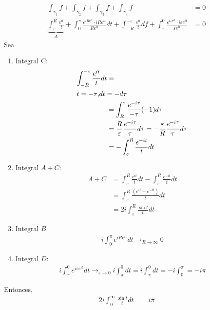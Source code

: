 \begin{ejemplo}
\begin{sol}
\begin{enumerate}
\begin{align*}
                \int_{\gamma_1}f+\int_{\gamma_2}f+\int_{\gamma_3}f+\int_{\gamma_4}f &= 0\\
                \underbrace{\int_{\varepsilon}^R \frac{e^{it}}{t}}_{A}+ \int_{0}^{\pi} \frac{e^{iRe^{it}}\cdot iRe^{it}}{Re^{it}}dt+\int_{-R}^{-\varepsilon}\frac{e^{it}}{t}df+\int_\pi^0 \frac{e^{i\varepsilon e^{it}}\cdot i\varepsilon e^{it}}{\varepsilon e^{it}} &= 0
            \end{align*}
            Sea 
            \begin{enumerate}
                \item Integral C:
                \begin{align*}
                    \int_{-R}^{-\varepsilon}\frac{e^{it}}{t}dt &=\\
                    \intertext{$t=-\tau$,$dt=-d\tau$}
                    &= \int_{R}^{\varepsilon}\frac{e^{-i\tau}}{-\tau}(-1)d\tau\\
                    &= \frac{R}{\varepsilon} \frac{e^{-i\tau}}{\tau}d\tau = -\frac{\varepsilon}{R}\frac{e^{-i\tau}}{\tau}d\tau\\
                    &= -\int_{\varepsilon}^R\frac{e^{-it}}{t}dt
                \end{align*}
                \item Integral $A+C$: 
                \begin{align*}
                    A+C &= \int_{\varepsilon}^R \frac{e^{it}}{t}dt -\int_{\varepsilon}^R\frac{e^{-it}}{t}dt\\
                    &= \int_{\varepsilon}^R \frac{(e^{it}-e^{-it})}{t}dt\\
                    &= 2i \int_{\varepsilon}^R\frac{\sin t}{t}dt
                \end{align*}
                \item Integral $B$
                \begin{align*}
                    i\int_0^{\pi}e^{iRe^{it}}dt \to_{R\to\infty}0
                \end{align*}
                \item Integral $D$: 
                \begin{align*}
                    i\int_{\pi}^{0} e^{i\varepsilon e^{it}}dt\to_{\varepsilon\to 0}i\int_\pi^0 dt = i\int_{\pi}^0 dt = -i\int_0^{\pi} = -i\pi
                \end{align*}
            \end{enumerate}Entonces, 
            \begin{align*}
                2i\int_0^{\infty}\frac{\sin t}{t}dt &= i\pi
            \end{align*}
        \end{enumerate}
    \end{sol}
\end{ejemplo}